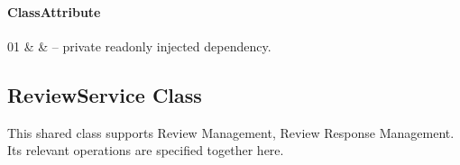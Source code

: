 \paragraph{ClassAttribute}
\begin{ClassAttributeTable}
01 &  &  -- private readonly injected dependency. \\ \hline
\end{ClassAttributeTable}

\subsection{ReviewService Class}
\label{cls:nhuy-ReviewService}

This shared class supports Review Management, Review Response Management. Its relevant operations are specified together here.

